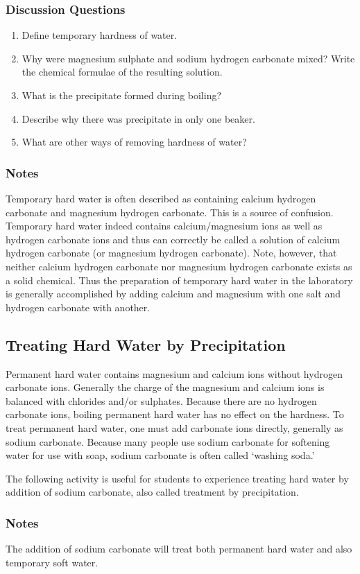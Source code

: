 \subsubsection*{Discussion Questions}
\begin{enumerate}
\item{Define temporary hardness of water.}
\item{Why were magnesium sulphate and sodium hydrogen carbonate mixed? Write the chemical formulae of the resulting solution.}
\item{What is the precipitate formed during boiling?}
\item{Describe why there was precipitate in only one beaker.}
\item{What are other ways of removing hardness of water?}
\end{enumerate}

\subsubsection*{Notes}
Temporary hard water is often described as containing calcium hydrogen carbonate and magnesium hydrogen carbonate. This is a source of confusion. Temporary hard water indeed contains calcium/magnesium ions as well as hydrogen carbonate ions and thus can correctly be called a solution of calcium hydrogen carbonate (or magnesium hydrogen carbonate). Note, however, that neither calcium hydrogen carbonate nor magnesium hydrogen carbonate exists as a solid chemical. Thus the preparation of temporary hard water in the laboratory is generally accomplished by adding calcium and magnesium with one salt and hydrogen carbonate with another.

\subsection{Treating Hard Water by Precipitation}

Permanent hard water contains magnesium and calcium ions without hydrogen carbonate ions. Generally the charge of the magnesium and calcium ions is balanced with chlorides and/or sulphates. Because there are no hydrogen carbonate ions, boiling permanent hard water has no effect on the hardness. To treat permanent hard water, one must add carbonate ions directly, generally as sodium carbonate. Because many people use sodium carbonate for softening water for use with soap, sodium carbonate is often called `washing soda.'

The following activity is useful for students to experience treating hard water by addition of sodium carbonate, also called treatment by precipitation.

\subsubsection{Notes}
The addition of sodium carbonate will treat both permanent hard water and also temporary soft water.
